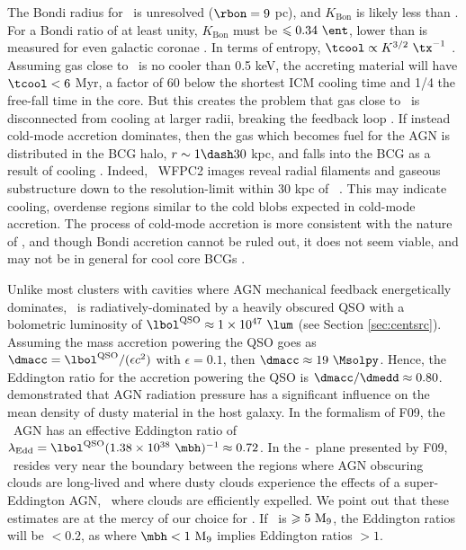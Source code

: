 \documentclass[useAMS,usenatbib]{mn2e}
\begin{document}
The Bondi radius for \irs\ is unresolved ($\rbon = 9$ pc), and
$K_{\mathrm{Bon}}$ is likely less than \kna. For a Bondi ratio of at
least unity, $K_{\mathrm{Bon}}$ must be $\le 0.34 ~\ent$, lower than
is measured for even galactic coronae \citep{coronae}. In terms of
entropy, $\tcool \propto K^{3/2} ~\tx^{-1}$ \citep{d06}. Assuming gas
close to \rbon\ is no cooler than 0.5 keV, the accreting material will
have $\tcool < 6$ Myr, a factor of 60 below the shortest ICM cooling
time and 1/4 the free-fall time in the core. But this creates the
problem that gas close to \rbon\ is disconnected from cooling at
larger radii, breaking the feedback loop
\citep{2006NewA...12...38S}. If instead cold-mode accretion dominates,
then the gas which becomes fuel for the AGN is distributed in the BCG
halo, $r \sim 1 \dash 30$ kpc, and falls into the BCG as a result of
cooling \citep{pizzolato05, 2010arXiv1003.4181P}. Indeed, \hst\ WFPC2
images reveal radial filaments and gaseous substructure down to the
resolution-limit within 30 kpc of \irs\ \citep{1999Ap&SS.266..113A}.
This may indicate cooling, overdense regions similar to the cold blobs
expected in cold-mode accretion. The process of cold-mode accretion is
more consistent with the nature of \irs, and though Bondi accretion
cannot be ruled out, it does not seem viable, and may not be in
general for cool core BCGs \citep{minaspin}.

Unlike most clusters with cavities where AGN mechanical feedback
energetically dominates, \irs\ is radiatively-dominated by a heavily
obscured QSO with a bolometric luminosity of $\lqso \approx 1 \times
10^{47} ~\lum$ (see Section \ref{sec:centsrc}). Assuming the mass
accretion powering the QSO goes as $\dmacc = \lqso/(\epsilon c^2)$
with $\epsilon = 0.1$, then $\dmacc \approx 19 ~\Msolpy$. Hence, the
Eddington ratio for the accretion powering the QSO is $\dmacc/\dmedd
\approx 0.80$. \citet[][hereafter F09]{2009MNRAS.394L..89F}
demonstrated that AGN radiation pressure has a significant influence
on the mean density of dusty material in the host galaxy. In the
formalism of F09, the \irs\ AGN has an effective Eddington ratio of
$\leff = \lqso (1.38 \times 10^{38} ~\mbh)^{-1} \approx 0.72$. In the
\nhi-\leff\ plane presented by F09, \irs\ resides very near the
boundary between the regions where AGN obscuring clouds are long-lived
and where dusty clouds experience the effects of a super-Eddington
AGN, \ie\ where clouds are efficiently expelled. We point out that
these estimates are at the mercy of our choice for \mbh. If \mbh\ is
$\geqslant 5 ~\mathrm{M}_9$, the Eddington ratios will be $< 0.2$, as where $\mbh
< 1 ~\mnine$ implies Eddington ratios $> 1$.
\end{document}
